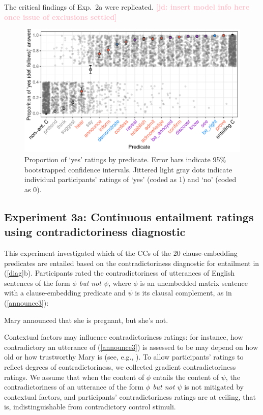 \documentclass[11pt,fleqn]{article}
\newcommand{\jd}[1]{\textbf{\textcolor{Pink}{[jd: #1]}}}
\newcommand{\6}{\mbox{$[\hspace*{-.6mm}[$}}
\newcommand{\9}{\mbox{$]\hspace*{-.6mm}]$}}
\begin{document}
The critical findings of Exp.~2a were replicated.  \jd{insert model info here once issue of exclusions settled} 
 
\begin{figure}[H]
\centering
\includegraphics[width=.7\paperwidth]{../../results/7-veridicality3-binary/graphs/proportion-by-predicate-variability-individual}

\caption{Proportion of `yes' ratings by predicate. Error bars indicate 95\% bootstrapped confidence intervals. Jittered light gray dots indicate individual participants' ratings of `yes' (coded as 1) and `no' (coded as 0). }
\label{fig:2bresults}
\end{figure}


\subsection{Experiment 3a: Continuous entailment ratings using contradictoriness diagnostic}\label{s32}

This experiment investigated which of the CCs of the 20 clause-embedding predicates are entailed based on the contradictoriness diagnostic for entailment in (\ref{diag}b). Participants rated the contradictoriness of utterances of English sentences of the form {\em $\phi$ but not $\psi$}, where $\phi$ is an unembedded matrix sentence with a clause-embedding predicate and $\psi$ is its clausal complement, as in (\ref{announce3}):

\begin{exe}
\ex\label{announce3} Mary announced that she is pregnant, but she's not.
\end{exe}
Contextual factors may influence contradictoriness ratings: for instance, how contradictory an utterance of (\ref{announce3}) is assessed to be may depend on how old or how trustworthy Mary is (see, e.g., \citealt{schlenker10,demarneffe-etal2012}). To allow participants' ratings to reflect degrees of contradictoriness, we collected gradient contradictoriness ratings. We assume that when the content of $\phi$ entails the content of $\psi$, the contradictoriness of an utterance of the form {\em $\phi$ but not $\psi$} is not mitigated by contextual factors, and participants' contradictoriness ratings are at ceiling, that is, indistinguishable from contradictory control stimuli.
\end{document}
